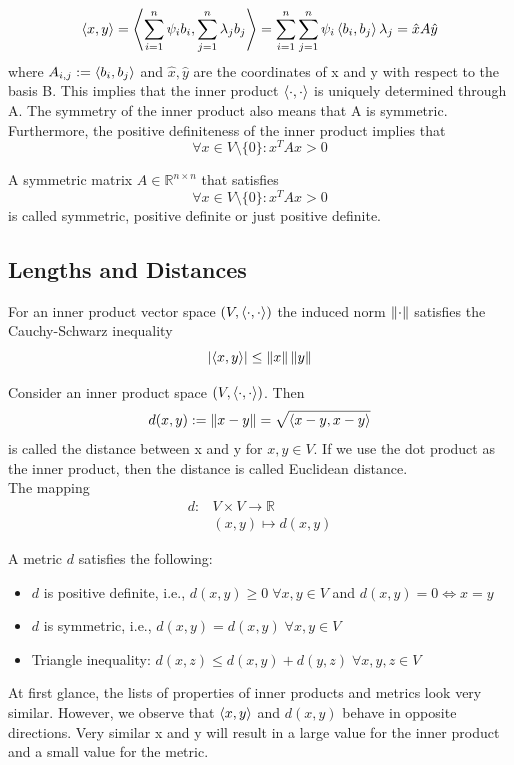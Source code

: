 \[ 
    \left\langle x,y\right\rangle = \left\langle\sum_{i=1}^{n}{\psi_ib_i}, \sum_{j=1}^{n}{\lambda_j b_j}\right\rangle = \sum_{i=1}^{n}{\sum_{j=1}^{n}{\psi_i\left\langle b_i,b_j\right\rangle\lambda_j}} = \hat{x}A\hat{y}
\]where $A_{i,j} := \left\langle b_i,b_j\right\rangle$ and $\hat{x},\hat{y}$ are the coordinates of x and y with respect to the basis B. This implies that the inner product $\left\langle\cdot, \cdot\right\rangle$ is uniquely determined through A. The symmetry of the inner product also means that A is symmetric. Furthermore, the positive definiteness of the inner product implies that
\[ 
    \forall x \in V \setminus\{0\} : x^TAx>0
\]
\begin{definition}
    A symmetric matrix $A \in \mathbb{R}^{n\times n}$ that satisfies 
    \[ 
        \forall x \in V \setminus\{0\} : x^TAx>0 
    \]
    is called symmetric, positive definite or just positive definite. 
\end{definition}

\subsection*{Lengths and Distances}
\begin{remark}
    For an inner product vector space $(V, \left\langle\cdot, \cdot\right\rangle)$ the induced norm $\left\lVert\cdot\right\rVert$ satisfies the Cauchy-Schwarz inequality 
    \[ 
        \left\lvert\left\langle x,y\right\rangle\right\rvert \leq \left\lVert x\right\rVert\left\lVert y\right\rVert 
    \]
\end{remark}
\begin{definition}
    Consider an inner product space $(V, \left\langle\cdot, \cdot\right\rangle)$. Then 
    \[ 
        d(x,y):= \left\lVert x-y\right\rVert = \sqrt{\left\langle x-y,x-y\right\rangle}
    \]is called the distance between x and y for $x,y \in V$. If we use the dot product as the inner product, then the distance is called Euclidean distance.\\
    The mapping
    \begin{align*}
        d: &V \times V \longrightarrow \mathbb{R}\\
        &(x,y) \mapsto d(x,y)
    \end{align*}
\end{definition}
A metric $d$ satisfies the following:
\begin{itemize}
    \item $d$ is positive definite, i.e., $d(x,y) \geq 0\; \forall x,y \in V$ and $d(x,y) = 0 \Longleftrightarrow x=y$
    \item $d$ is symmetric, i.e., $d(x,y) = d(x,y)\; \forall x,y \in V$
    \item Triangle inequality: $d(x,z) \leq d(x,y)+d(y,z) \; \forall x,y,z \in V$
\end{itemize}
\begin{remark}
    At first glance, the lists of properties of inner products and metrics look very similar. However, we observe that $\left\langle x,y\right\rangle$ and $d(x,y) $ behave in opposite directions. Very similar x and y will result in a large value for the inner product and a small value for the metric.
\end{remark}
